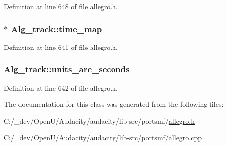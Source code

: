 Definition at line 648 of file allegro.\+h.

\subsubsection[{\texorpdfstring{time\+\_\+map}{time_map}}]{$\ast$ Alg\+\_\+track\+::time\+\_\+map\hspace{0.3cm}{\ttfamily [protected]}}\hypertarget{class_alg__track_ad9c8b779f82b1a4cac9e5ac34919197f}{}\label{class_alg__track_ad9c8b779f82b1a4cac9e5ac34919197f}


Definition at line 641 of file allegro.\+h.

\subsubsection[{\texorpdfstring{units\+\_\+are\+\_\+seconds}{units_are_seconds}}]{ Alg\+\_\+track\+::units\+\_\+are\+\_\+seconds\hspace{0.3cm}{\ttfamily [protected]}}\hypertarget{class_alg__track_a0e6a77b346f4e48af674cd9a647f9e7f}{}\label{class_alg__track_a0e6a77b346f4e48af674cd9a647f9e7f}


Definition at line 642 of file allegro.\+h.



The documentation for this class was generated from the following files\+:\begin{DoxyCompactItemize}
\item 
C\+:/\+\_\+dev/\+Open\+U/\+Audacity/audacity/lib-\/src/portsmf/\hyperlink{allegro_8h}{allegro.\+h}\item 
C\+:/\+\_\+dev/\+Open\+U/\+Audacity/audacity/lib-\/src/portsmf/\hyperlink{allegro_8cpp}{allegro.\+cpp}\end{DoxyCompactItemize}
